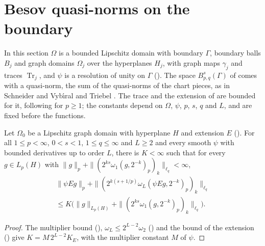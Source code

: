 \section{Besov quasi-norms on the boundary}
\label{sec:boundary-besov-norm}

In this section $\Omega$ is a bounded Lipschitz domain with boundary $\Gamma$, boundary balls
$B_j$ and graph domains $\Omega_j$ over the hyperplanes $H_j$, with graph maps $\gamma_j$ and traces
$\operatorname{Tr}_j$, and $\psi$ is a resolution of unity on $\Gamma$
(). The space $B^s_{p,q}(\Gamma)$ of  comes
with a quasi-norm, the sum of the quasi-norms of the chart pieces, as in Schneider and Vyb\'{\i}ral
\cite[Definition 3.3]{SchneiderVybiral} and Triebel \cite{Triebel2002}. The trace and the
extension of  are bounded for it, following
\cite[Theorem 4.11]{SchneiderVybiral} for $p \geq 1$; the constants depend on $\Omega$, $\psi$, $p$,
$s$, $q$ and $L$, and are fixed before the functions.

\begin{lemma}
\label{lem:chart-extension-bound}
\leanok
{}
Let $\Omega_0$ be a Lipschitz graph domain with hyperplane $H$ and extension $E$
(). For all $1 \leq p < \infty$, $0 < s < 1$,
$1 \leq q \leq \infty$ and $L \geq 2$ and every smooth $\psi$ with bounded derivatives up to
order $L$, there is $K < \infty$ such that for every $g \in L_p(H)$ with
$\|g\|_p + \|(2^{ks} \omega_1(g, 2^{-k})_p)_k\|_{\ell_q} < \infty$,
\begin{multline*}
  \|\psi E g\|_p + \|(2^{k(s + 1/p)} \omega_L(\psi E g, 2^{-k})_p)_k\|_{\ell_q}
  \\ \leq K \bigl(\|g\|_{L_p(H)} + \|(2^{ks} \omega_1(g, 2^{-k})_p)_k\|_{\ell_q}\bigr).
\end{multline*}
\end{lemma}

\begin{proof}
\leanok
The multiplier bound (), $\omega_L \leq 2^{L-2} \omega_2$
() and the bound of the extension () give
$K = M \, 2^{L-2} K_E$, with the multiplier constant $M$ of $\psi$.
\end{proof}

